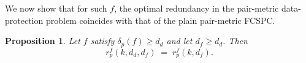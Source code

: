 \documentclass[11pt,draftclsnofoot,journal,onecolumn]{IEEEtran}
\newtheorem{proposition}{Proposition}
\begin{document}
    
    \noindent


    \noindent
    We now show that for such $f$, the optimal redundancy in the pair-metric data-protection problem coincides with that of the plain pair-metric FCSPC.
    
 
    \begin{proposition}
    \label{prop:dd-sep-equality}
    Let $f$ satisfy $\delta_{p}(f)\ge d_d$ and let $d_f\ge d_d$. Then
    \[
    r^f_p(k,d_d,d_f)\;=\;r^f_p(k,d_f).
    \]
    \end{proposition}
 
\end{document}

